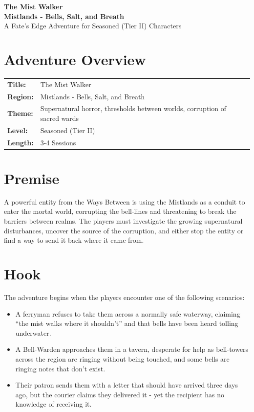 \documentclass[11pt]{article}
\begin{document}


\begin{center}
    \textbf{\LARGE The Mist Walker} \\
    \vspace{0.2cm}
    \textbf{Mistlands - Bells, Salt, and Breath} \\
    \vspace{0.1cm}
    \small A Fate's Edge Adventure for Seasoned (Tier II) Characters
\end{center}

\section*{Adventure Overview}
\begin{longtable}{@{}ll}
    \textbf{Title:} & The Mist Walker \\
    \textbf{Region:} & Mistlands - Bells, Salt, and Breath \\
    \textbf{Theme:} & Supernatural horror, thresholds between worlds, corruption of sacred wards \\
    \textbf{Level:} & Seasoned (Tier II) \\
    \textbf{Length:} & 3-4 Sessions \\
\end{longtable}

\section*{Premise}
A powerful entity from the Ways Between is using the Mistlands as a conduit to enter the mortal world, corrupting the bell-lines and threatening to break the barriers between realms. The players must investigate the growing supernatural disturbances, uncover the source of the corruption, and either stop the entity or find a way to send it back where it came from.

\section*{Hook}
The adventure begins when the players encounter one of the following scenarios:
\begin{itemize}
    \item A ferryman refuses to take them across a normally safe waterway, claiming ``the mist walks where it shouldn't'' and that bells have been heard tolling underwater.
    \item A Bell-Warden approaches them in a tavern, desperate for help as bell-towers across the region are ringing without being touched, and some bells are ringing notes that don't exist.
    \item Their patron sends them with a letter that should have arrived three days ago, but the courier claims they delivered it - yet the recipient has no knowledge of receiving it.
\end{itemize}
\end{document}
